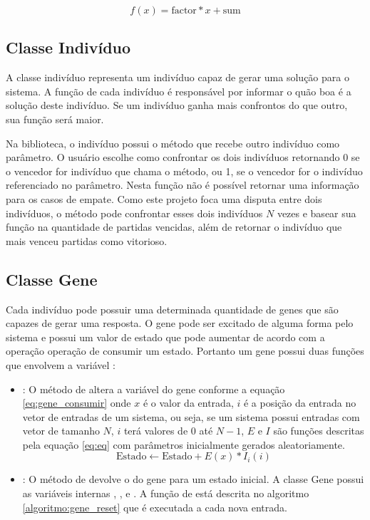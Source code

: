 \begin{equation}
    \label{eq:eq}
    f(x)=\mathrm{factor}*x + \mathrm{sum}
\end{equation}

\subsection{Classe Indivíduo}

A classe indivíduo representa um indivíduo capaz de gerar uma solução para o sistema. A função \fitness de cada indivíduo é responsável por informar o quão boa é a solução deste indivíduo. Se um indivíduo ganha mais confrontos do que outro, sua função \fitness será maior.

Na biblioteca, o indivíduo possui o método  que recebe outro indivíduo como parâmetro. O usuário escolhe como confrontar os dois indivíduos retornando 0 se o vencedor for indivíduo que chama o método, ou 1, se o vencedor for o indivíduo referenciado no parâmetro. Nesta função não é possível retornar uma informação para os casos de empate. Como este projeto foca uma disputa entre dois indivíduos, o método  pode confrontar esses dois indivíduos $N$ vezes e basear sua função \fitness na quantidade de partidas vencidas, além de retornar o indivíduo que mais venceu partidas como vitorioso.

\subsection{Classe Gene}

Cada indivíduo pode possuir uma determinada quantidade de genes que são capazes de gerar uma resposta. O gene pode ser excitado de alguma forma pelo sistema e possui um valor de estado que pode aumentar de acordo com a operação operação de consumir um estado. Portanto um gene possui duas funções que envolvem a variável :

\begin{itemize}
    \item {}: O método de  altera a variável  do gene conforme a equação \ref{eq:gene_consumir} onde $x$ é o valor da entrada, $i$ é a posição da entrada no vetor de entradas de um sistema, ou seja, se um sistema possui entradas com vetor de tamanho $N$, $i$ terá valores de 0 até $N-1$, $E$ e $I$ são funções descritas pela equação \ref{eq:eq} com parâmetros inicialmente gerados aleatoriamente.
    \begin{equation}
        \label{eq:gene_consumir}
        \mathrm{Estado} \leftarrow \mathrm{Estado} +  E(x) * I_i(i)
    \end{equation}
    \item {}: O método de  devolve o  do gene para um estado inicial. A classe Gene possui as variáveis internas , ,  e . A função de  está descrita no algoritmo \ref{algoritmo:gene_reset} que é executada a cada nova entrada.
\end{itemize}

